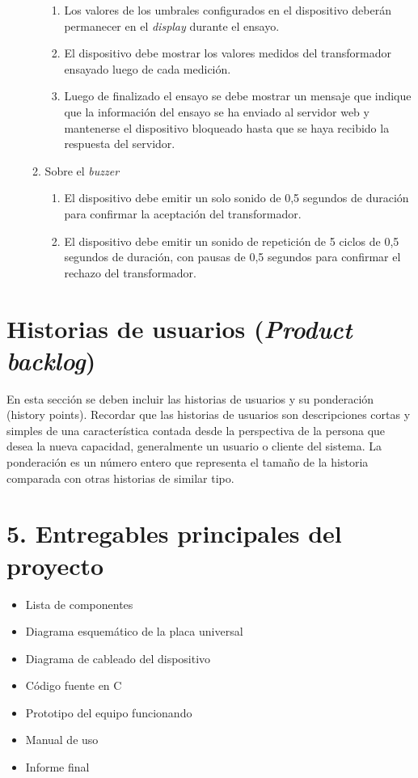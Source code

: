 \documentclass[11pt]{charter}
\begin{document}
\begin{enumerate}
\begin{enumerate}
\begin{enumerate}
		\item Los valores de los umbrales configurados en el dispositivo deberán permanecer en el \textit{display} durante el ensayo.
		\item El dispositivo debe mostrar los valores medidos del transformador ensayado luego de cada medición.
		\item Luego de finalizado el ensayo se debe mostrar un mensaje que indique que la información del ensayo se ha enviado al servidor web y mantenerse el dispositivo bloqueado hasta que se haya recibido la respuesta del servidor.
		\end{enumerate}
	\item Sobre el \textit{buzzer}
		\begin{enumerate}
		\item El dispositivo debe emitir un solo sonido de 0,5 segundos de duración para confirmar la aceptación del transformador.
		\item El dispositivo debe emitir un sonido de repetición de 5 ciclos de 0,5 segundos de duración, con pausas de 0,5 segundos para confirmar el rechazo del transformador.
		\end{enumerate}		
	\end{enumerate}
\end{enumerate}



\section{Historias de usuarios (\textit{Product backlog})}

En esta sección se deben incluir las historias de usuarios y su ponderación (history points). Recordar que las historias de usuarios son descripciones cortas y simples de una característica contada desde la perspectiva de la persona que desea la nueva capacidad, generalmente un usuario o cliente del sistema. La ponderación es un número entero que representa el tamaño de la historia comparada con otras historias de similar tipo.

\label{sec:backlog}

\section{5. Entregables principales del proyecto}
\label{sec:entregables}


\begin{itemize}
\item Lista de componentes
\item Diagrama esquemático de la placa universal
\item Diagrama de cableado del dispositivo
\item Código fuente en C
\item Prototipo del equipo funcionando
\item Manual de uso
\item Informe final
\end{itemize}
\end{document}
